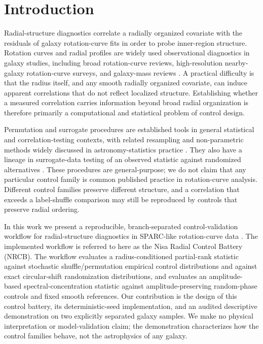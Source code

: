 \section{Introduction}
\label{sec:introduction}

Radial-structure diagnostics correlate a radially organized covariate with
the residuals of galaxy rotation-curve fits in order to probe inner-region
structure. Rotation curves and radial profiles are widely used observational
diagnostics in galaxy studies, including broad rotation-curve reviews,
high-resolution nearby-galaxy rotation-curve surveys, and galaxy-mass reviews
\citep{SofueRubin2001,deBlok2008,Courteau2014}. A practical difficulty is
that the radius itself, and any smooth radially organized covariate, can
induce apparent correlations that do not reflect localized structure. Establishing
whether a measured correlation
carries information beyond broad radial organization is therefore primarily
a computational and statistical problem of control design.

Permutation and surrogate procedures are established tools in general
statistical and correlation-testing contexts, with related resampling and
non-parametric methods widely discussed in astronomy-statistics practice
\citep{SchreiberSchmitz2000,Lancaster2018,FeigelsonBabu2012,PhipsonSmyth2010,YuHutson2022}.
They also have a lineage in surrogate-data testing of an observed statistic
against randomized alternatives \citep{Theiler1992}. These procedures are
general-purpose; we
do not claim that any particular control family is common published
practice in rotation-curve analysis. Different control families preserve
different structure, and a correlation that exceeds a label-shuffle
comparison may still be reproduced by controls that preserve radial
ordering.

{\setlength{\emergencystretch}{2em}
In this work we present a reproducible, branch-separated control-validation
workflow for radial-structure diagnostics in SPARC-like rotation-curve data
\citep{Lelli2016}. The implemented workflow is referred to here as the Nisa
Radial Control Battery (NRCB). The workflow evaluates a radius-conditioned
partial-rank statistic against stochastic shuffle/permutation empirical control
distributions and against exact circular-shift randomization distributions,
and evaluates an amplitude-based spectral-concentration statistic against
amplitude-preserving random-phase controls and fixed smooth references. Our
contribution is the design of this control battery, its deterministic-seed
implementation, and an audited descriptive demonstration on two explicitly
separated galaxy samples. We make no physical interpretation or
model-validation claim; the demonstration characterizes how the control
families behave, not the astrophysics of any galaxy.
\par}

